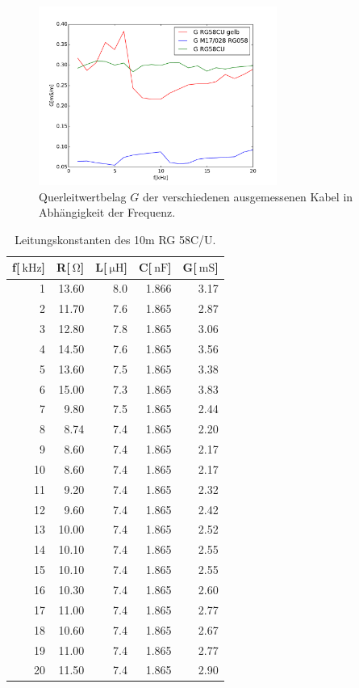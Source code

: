 \begin{figure}
\begin{minipage}{7.8cm}
	\end{minipage}
	\begin{minipage}{7.8cm}
		\includegraphics[width = 7.8cm]{data/a/G.pdf}
		\caption[]{Querleitwertbelag $G$ der verschiedenen ausgemessenen Kabel in Abhängigkeit der Frequenz.}
		\label{fig_konst4}
	\end{minipage}
\end{figure}

\begin{table}
\centering
	\caption[]{Leitungskonstanten des 10m RG 58C/U.}
	\begin{tabular}{r r r r r}
		f[$\SI{}{\kilo\hertz}$] & R[$\SI{}{\ohm}$] & L[$\SI{}{\micro\henry}$] & C[$\SI{}{\nano \farad}$] & G[$\SI{}{\milli\siemens}$]\\
		\hline \hline
		  1	&	13.60	&	8.0	&	1.866	&	3.17\\
		  2	&	11.70	&	7.6	&	1.865	&	2.87\\
		  3	&	12.80	&	7.8	&	1.865	&	3.06\\
		  4	&	14.50	&	7.6	&	1.865	&	3.56\\
		  5	&	13.60	&	7.5	&	1.865	&	3.38\\
		  6	&	15.00	&	7.3	&	1.865	&	3.83\\
		  7	&	 9.80	&	7.5	&	1.865	&	2.44\\
		  8	&	 8.74	&	7.4	&	1.865	&	2.20\\
		  9	&	 8.60	&	7.4	&	1.865	&	2.17\\
		 10	&	 8.60	&	7.4	&	1.865	&	2.17\\
		 11	&	 9.20	&	7.4	&	1.865	&	2.32\\
		 12	&	 9.60	&	7.4	&	1.865	&	2.42\\
		 13	&	10.00	&	7.4	&	1.865	&	2.52\\
		 14	&	10.10	&	7.4	&	1.865	&	2.55\\
		 15	&	10.10	&	7.4	&	1.865	&	2.55\\
		 16	&	10.30	&	7.4	&	1.865	&	2.60\\
		 17	&	11.00	&	7.4	&	1.865	&	2.77\\
		 18	&	10.60	&	7.4	&	1.865	&	2.67\\
		 19	&	11.00	&	7.4	&	1.865	&	2.77\\
		 20	&	11.50	&	7.4	&	1.865	&	2.90\\
			\hline
	\end{tabular}
	\label{tab_konst1}
\end{table}

